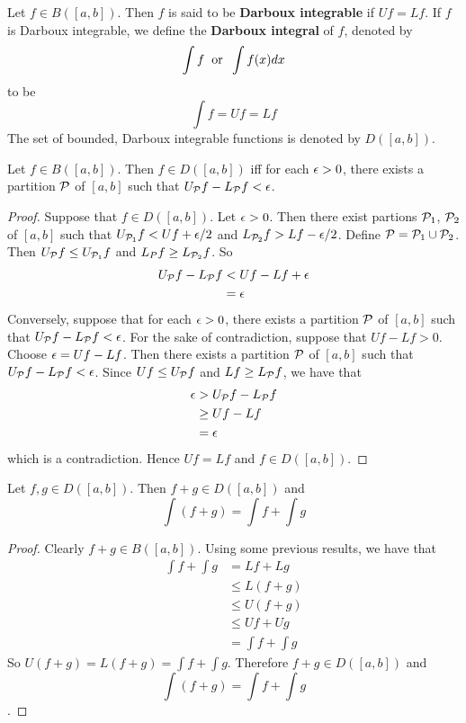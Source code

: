 \documentclass{book}
\begin{document}
	\begin{defn}  
		Let $f \in B([a,b])$. Then $f$ is said to be \textbf{Darboux integrable} if $Uf = Lf$. If $f$ is Darboux integrable, we define the \textbf{Darboux integral} of $f$, denoted by $$\int f \hspace{.2cm} \text{or} \hspace{.2cm} \int f(x) dx$$ to be $$\int f = Uf = Lf$$ The set of bounded, Darboux integrable functions is denoted by $D([a,b])$.
	\end{defn}

	\begin{ex}  
		Let $f \in B([a,b])$. Then $f \in D([a,b])$ iff for each $\epsilon >0$, there exists a partition $\mathcal{P}$ of $[a,b]$ such that $U_{\mathcal{P}} f - L_{\mathcal{P}} f < \epsilon$.
	\end{ex}

	\begin{proof}
		Suppose that $f \in D([a,b])$. Let $\epsilon >0$. Then there exist partions $\mathcal{P}_1$, $\mathcal{P}_2$ of $[a,b]$ such that $U_{\mathcal{P}_1} f < Uf + \epsilon/2$ and $L_{\mathcal{P}_2} f > Lf - \epsilon/2$. Define $\mathcal{P} = \mathcal{P}_1 \cup \mathcal{P}_2$. Then $U_{\mathcal{P}} f \leq U_{\mathcal{P}_1} f$ and $L_P f \geq L_{\mathcal{P}_2}f$. So  
		\begin{align*}
			U_{\mathcal{P}} f - L_{\mathcal{P}} f 
			&< Uf - L f + \epsilon \\
			&= \epsilon
		\end{align*}  
		Conversely, suppose that for each $\epsilon >0$, there exists a partition $\mathcal{P}$ of $[a,b]$ such that $U_{\mathcal{P}} f - L_{\mathcal{P}} f < \epsilon$. For the sake of contradiction, suppose that $Uf - Lf > 0$. Choose $\epsilon = Uf - Lf$. Then there exists a partition $\mathcal{P}$ of $[a,b]$ such that $U_{\mathcal{P}} f - L_{\mathcal{P}} f < \epsilon$. Since $Uf \leq U_{\mathcal{P}} f$ and $Lf \geq L_{\mathcal{P}} f$, we have that 
		\begin{align*}
			\epsilon 
			&> U_{\mathcal{P}} f - L_{\mathcal{P}} f \\
			&\geq Uf - Lf \\
			&= \epsilon
		\end{align*} 
		which is a contradiction. Hence $Uf = Lf$ and $f \in D([a,b])$.
	\end{proof}

	\begin{ex}  
		Let $f, g \in D([a,b])$. Then $f+g \in D([a,b])$ and $$\int (f+g) = \int f + \int g$$
	\end{ex}
	
	\begin{proof}
		Clearly $f+g \in B([a,b])$. Using some previous results, we have that 
		\begin{align*}
			\int f + \int g 
			&= Lf + Lg \\
			&\leq L(f+g) \\
			&\leq U(f+g) \\
			&\leq Uf + Ug \\
			&= \int f + \int g
		\end{align*}
		So $U(f+g) = L(f+g) = \int f + \int g$. Therefore $f+g \in D([a,b])$ and $$\int (f+g) = \int f + \int g$$.
	\end{proof}
\end{document}
